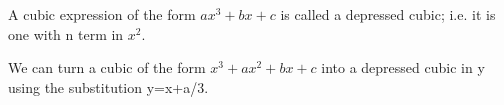 A cubic expression of the form $ax^{3}+bx+c$  is called a depressed 
cubic; i.e. it is one with n term in $x^{2}.$ 
\par
We can turn a cubic of the form $x^{3}+ax^{2}+bx+c$  into a 
depressed cubic in y using the substitution y=x+a/3.